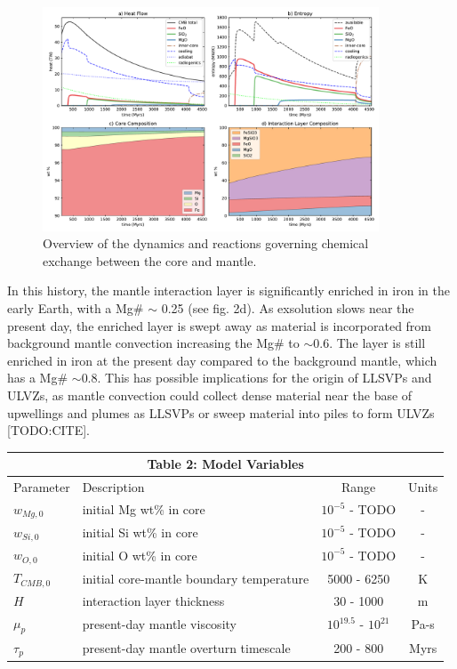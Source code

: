 \documentclass[]{article}
\begin{document}
	\begin{figure}\centering
		\includegraphics[width=10cm]{./figures/figure2.pdf}
		\caption{Overview of the dynamics and reactions governing chemical exchange between the core and mantle.}
		\label{fig2}
	\end{figure}
	
	In this history, the mantle interaction layer is significantly enriched in iron in the
	early Earth, with a Mg\# $\sim$ 0.25 (see fig. 2d). As exsolution slows near the present day, the enriched layer is swept away as material is incorporated from background mantle convection increasing the Mg\# to $\sim$0.6. The layer is still enriched in iron at the present	day compared to the background mantle, which has a Mg\#	$\sim$0.8. This has possible implications for the origin of LLSVPs and ULVZs, as mantle convection could collect dense material near the base of upwellings and plumes as LLSVPs or sweep material into piles to form ULVZs {[}TODO:CITE{]}. 
	
	\begin{center}\label{table:variables}
		\begin{tabular}{ l l c c}
			\multicolumn{4}{c}{Table 2: Model Variables} \\
			\hline
			Parameter & Description & Range & Units \\
			\hline
			$w_{Mg,0}$ & initial Mg wt\% in core & $10^{-5}$ - TODO & -\\
			$w_{Si,0}$ & initial Si wt\% in core		&$10^{-5}$ - TODO &-\\
			$w_{O,0}$ & initial O wt\% in core		& $10^{-5}$ - TODO&-\\
			$T_{CMB,0}$ & initial core-mantle boundary temperature & 5000 - 6250& K\\
			$H$ & interaction layer thickness& 30 - 1000 & m \\
			$\mu_p$ & present-day mantle viscosity & $10^{19.5}$ - $10^{21}$& Pa-s\\
			$\tau_p$ & present-day mantle overturn timescale	& 200 - 800 & Myrs\\
			\hline
		\end{tabular}
	\end{center}
	
\end{document}
